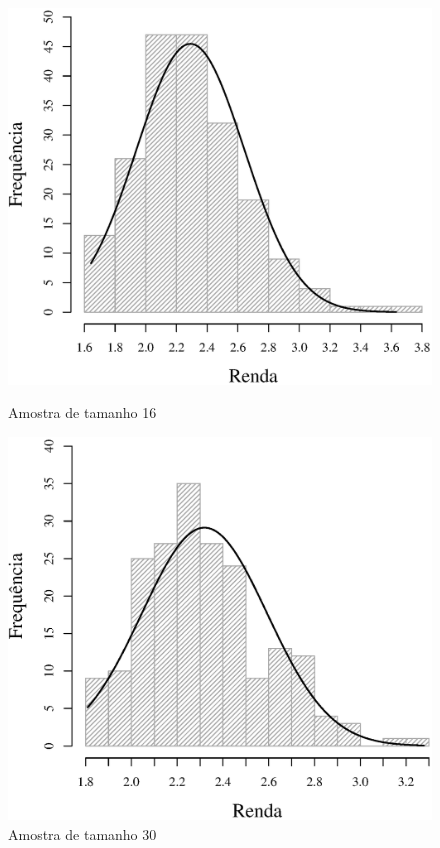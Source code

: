\begin{figure}[h]
\begin{minipage}{0.50\textwidth}
	\includegraphics[width=\linewidth]{plots/histogram_renda_n16.eps}
	\caption{Amostra de tamanho 16}
	\label{fig:m16}
\end{minipage}
\begin{minipage}{0.50\textwidth}
	\includegraphics[width=\linewidth]{plots/histogram_renda_n30.eps}
	\caption{Amostra de tamanho 30}
	\label{fig:m30}
\end{minipage}
\end{figure}

